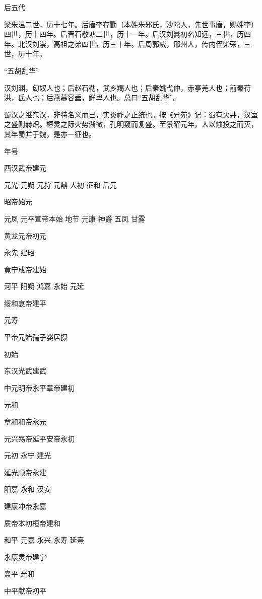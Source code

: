 \documentclass[a4paper,12pt,UTF8,twoside]{ctexbook}
\begin{document}
    后五代
    
    梁朱温二世，历十七年。后唐李存勖（本姓朱邪氏，沙陀人，先世事唐，赐姓李）四世，历十四年。后晋石敬塘二世，历十一年。后汉刘暠初名知远，三世，历四年。北汉刘崇，高祖之弟四世，历三十年。后周郭威，邢州人，传内侄柴荣，三世，历十年。
    
    “五胡乱华”
    
    汉刘渊，匈奴人也；后赵石勒，武乡羯人也；后秦姚弋仲，赤亭羌人也；前秦苻洪，氐人也；后燕慕容垂，鲜卑人也。总曰“五胡乱华”。
    
    蜀汉之继东汉，非特名义而已，实炎祚之正统也。按《异苑》记：蜀有火井，汉室之盛则赫炽。桓灵之际火势渐微，孔明窥而复盛。至景曜元年，人以烛投之而灭，其年蜀并于魏，是亦一征也。
    
    年号
    
    西汉武帝建元
    
    元光
    元朔
    元狩
    元鼎
    大初
    征和
    后元
    
    昭帝始元
    
    元凤
    元平宣帝本始
    地节
    元康
    神爵
    五凤
    甘露
    
    黄龙元帝初元
    
    永先
    建昭
    
    竟宁成帝建始
    
    河平
    阳朔
    鸿嘉
    永始
    元延
    
    绥和哀帝建平
    
    元寿
    
    平帝元始孺子婴居摄
    
    初始
    
    东汉光武建武
    
    中元明帝永平章帝建初
    
    元和
    
    章和和帝永元
    
    元兴殇帝延平安帝永初
    
    元初
    永宁
    建光
    
    延光顺帝永建
    
    阳嘉
    永和
    汉安
    
    建康冲帝永嘉
    
    质帝本初桓帝建和
    
    和平
    元嘉
    永兴
    永寿
    延熹
    
    永康灵帝建宁
    
    熹平
    光和
    
    中平献帝初平
    
\end{document}
